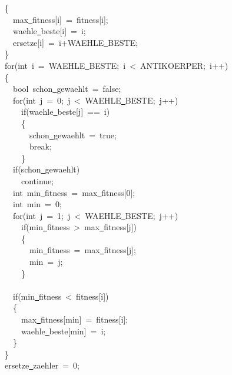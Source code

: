 {\ \ \ \ \{\\
\ \ \ \ \ \ max\underline\ fitness[i]\ =\ fitness[i];\\
\ \ \ \ \ \ waehle\underline\ beste[i]\ =\ i;\\
\ \ \ \ \ \ ersetze[i]\ =\ i+WAEHLE\underline\ BESTE;\\
\ \ \ \ \}\\
\ \ \ \ for(int\ i\ =\ WAEHLE\underline\ BESTE;\ i\ <{}\ ANTIKOERPER;\ i++)\\
\ \ \ \ \{\\
\ \ \ \ \ \ bool\ schon\underline\ gewaehlt\ =\ false;\\
\ \ \ \ \ \ for(int\ j\ =\ 0;\ j\ <{}\ WAEHLE\underline\ BESTE;\ j++)\\
\ \ \ \ \ \ \ \ if(waehle\underline\ beste[j]\ ==\ i)\\
\ \ \ \ \ \ \ \ \{\\
\ \ \ \ \ \ \ \ \ \ schon\underline\ gewaehlt\ =\ true;\\
\ \ \ \ \ \ \ \ \ \ break;\\
\ \ \ \ \ \ \ \ \}\\
\ \ \ \ \ \ if(schon\underline\ gewaehlt)\\
\ \ \ \ \ \ \ \ continue;\\
\ \ \ \ \ \ int\ min\underline\ fitness\ =\ max\underline\ fitness[0];\\
\ \ \ \ \ \ int\ min\ =\ 0;\\
\ \ \ \ \ \ for(int\ j\ =\ 1;\ j\ <{}\ WAEHLE\underline\ BESTE;\ j++)\\
\ \ \ \ \ \ \ \ if(min\underline\ fitness\ >{}\ max\underline\ fitness[j])\\
\ \ \ \ \ \ \ \ \{\\
\ \ \ \ \ \ \ \ \ \ min\underline\ fitness\ =\ max\underline\ fitness[j];\\
\ \ \ \ \ \ \ \ \ \ min\ =\ j;\\
\ \ \ \ \ \ \ \ \}\\
\ \ \ \ \ \ \\
\ \ \ \ \ \ if(min\underline\ fitness\ <{}\ fitness[i])\\
\ \ \ \ \ \ \{\\
\ \ \ \ \ \ \ \ max\underline\ fitness[min]\ =\ fitness[i];\\
\ \ \ \ \ \ \ \ waehle\underline\ beste[min]\ =\ i;\\
\ \ \ \ \ \ \}\\
\ \ \ \ \}\\
\ \ \ \ ersetze\underline\ zaehler\ =\ 0;\\
}
